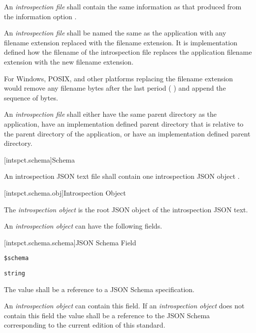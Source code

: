 \pnum
An \emph{introspection file} shall contain the same information as that produced
from the  information option .

\pnum
An \emph{introspection file} shall be named the same as the application with
any filename extension replaced with the \verb@stdinfo@ filename extension. It
is implementation defined how the filename of the introspection file replaces
the application filename extension with the new \verb@stdinfo@ filename
extension.

\begin{note}
	For Windows, POSIX, and other platforms replacing the filename extension
	would remove any filename bytes after the last period
	( ) and append the \verb@stdinfo@ sequence of
	bytes.
\end{note}

\pnum
An \emph{introspection file} shall either have the same parent directory as
the application, have an implementation defined parent directory that is
relative to the parent directory of the application, or have an implementation
defined parent directory.

[intspct.schema]{Schema}

\pnum
An introspection JSON text file shall contain one introspection JSON object
.

[intspct.schema.obj]{Introspection Object}

\pnum
The \emph{introspection object} is the root JSON object of the introspection
JSON text.

\pnum
An \emph{introspection object} can have the following fields.

[intspct.schema.schema]{JSON Schema Field}

\begin{itemdescr}

	\pnum
	\fldname
	\verb|$schema|

	\pnum
	\fldtype
	\verb|string|

	\pnum
	\fldval
	The value shall be a reference to a JSON Schema specification.

	\pnum
	\flddesc
	An \emph{introspection object} can contain this field.
	If an \emph{introspection object} does not contain this field the value
	shall be a reference to the JSON Schema corresponding to the current
	edition of this standard.

\end{itemdescr}

